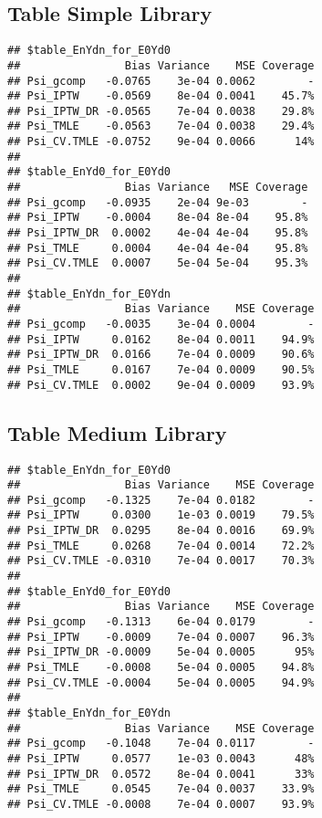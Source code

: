 \documentclass[11pt]{article}\usepackage[]{graphicx}\usepackage[]{color}
\makeatletter
\newenvironment{kframe}{%
 \def\at@end@of@kframe{}%
 \ifinner\ifhmode%
  \def\at@end@of@kframe{\end{minipage}}%
  \begin{minipage}{\columnwidth}%
 \fi\fi%
 \def\FrameCommand##1{\hskip\@totalleftmargin \hskip-\fboxsep
 \colorbox{shadecolor}{##1}\hskip-\fboxsep
     \hskip-\linewidth \hskip-\@totalleftmargin \hskip\columnwidth}%
 \MakeFramed {\advance\hsize-\width
   \@totalleftmargin\z@ \linewidth\hsize
   \@setminipage}}%
 {\par\unskip\endMakeFramed%
 \at@end@of@kframe}
\newenvironment{knitrout}{}{} %
\makeatother
\begin{document}
\subsection{Table Simple Library}
\begin{knitrout}
\color{fgcolor}\begin{kframe}
\begin{verbatim}
## $table_EnYdn_for_E0Yd0
##                Bias Variance    MSE Coverage
## Psi_gcomp   -0.0765    3e-04 0.0062        -
## Psi_IPTW    -0.0569    8e-04 0.0041    45.7%
## Psi_IPTW_DR -0.0565    7e-04 0.0038    29.8%
## Psi_TMLE    -0.0563    7e-04 0.0038    29.4%
## Psi_CV.TMLE -0.0752    9e-04 0.0066      14%
## 
## $table_EnYd0_for_E0Yd0
##                Bias Variance   MSE Coverage
## Psi_gcomp   -0.0935    2e-04 9e-03        -
## Psi_IPTW    -0.0004    8e-04 8e-04    95.8%
## Psi_IPTW_DR  0.0002    4e-04 4e-04    95.8%
## Psi_TMLE     0.0004    4e-04 4e-04    95.8%
## Psi_CV.TMLE  0.0007    5e-04 5e-04    95.3%
## 
## $table_EnYdn_for_E0Ydn
##                Bias Variance    MSE Coverage
## Psi_gcomp   -0.0035    3e-04 0.0004        -
## Psi_IPTW     0.0162    8e-04 0.0011    94.9%
## Psi_IPTW_DR  0.0166    7e-04 0.0009    90.6%
## Psi_TMLE     0.0167    7e-04 0.0009    90.5%
## Psi_CV.TMLE  0.0002    9e-04 0.0009    93.9%
\end{verbatim}
\end{kframe}
\end{knitrout}
\subsection{Table Medium Library}
\begin{knitrout}
\color{fgcolor}\begin{kframe}
\begin{verbatim}
## $table_EnYdn_for_E0Yd0
##                Bias Variance    MSE Coverage
## Psi_gcomp   -0.1325    7e-04 0.0182        -
## Psi_IPTW     0.0300    1e-03 0.0019    79.5%
## Psi_IPTW_DR  0.0295    8e-04 0.0016    69.9%
## Psi_TMLE     0.0268    7e-04 0.0014    72.2%
## Psi_CV.TMLE -0.0310    7e-04 0.0017    70.3%
## 
## $table_EnYd0_for_E0Yd0
##                Bias Variance    MSE Coverage
## Psi_gcomp   -0.1313    6e-04 0.0179        -
## Psi_IPTW    -0.0009    7e-04 0.0007    96.3%
## Psi_IPTW_DR -0.0009    5e-04 0.0005      95%
## Psi_TMLE    -0.0008    5e-04 0.0005    94.8%
## Psi_CV.TMLE -0.0004    5e-04 0.0005    94.9%
## 
## $table_EnYdn_for_E0Ydn
##                Bias Variance    MSE Coverage
## Psi_gcomp   -0.1048    7e-04 0.0117        -
## Psi_IPTW     0.0577    1e-03 0.0043      48%
## Psi_IPTW_DR  0.0572    8e-04 0.0041      33%
## Psi_TMLE     0.0545    7e-04 0.0037    33.9%
## Psi_CV.TMLE -0.0008    7e-04 0.0007    93.9%
\end{verbatim}
\end{kframe}
\end{knitrout}
\end{document}
